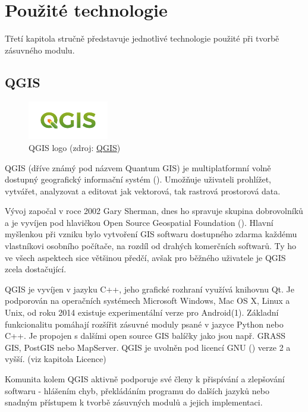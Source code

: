 \chapter{Použité technologie}
\label{3-technologie}

Třetí kapitola stručně představuje jednotlivé technologie použité při tvorbě zásuvného modulu.

\section{QGIS}

\begin{figure}[H]
    \centering
      \includegraphics[width=100pt]{./pictures/qgis-logo.png}
      \caption[QGIS logo]{QGIS logo 
      (zdroj: \href{https://www.qgis.org/en/_downloads/qgis-logo.png}{QGIS})}
      \label{fig:qgis}
  \end{figure}

QGIS (dříve známý pod názvem Quantum GIS) je multiplatformní volně dostupný geografický informační systém (). Umožňuje uživateli prohlížet, vytvářet, analyzovat a editovat jak vektorová, tak rastrová prostorová data.

Vývoj započal v roce 2002 Gary Sherman, dnes ho spravuje skupina dobrovolníků a je vyvíjen pod hlavičkou Open Source Geospatial Foundation (). Hlavní myšlenkou při vzniku bylo vytvoření GIS softwaru dostupného zdarma každému vlastníkovi osobního počítače, na rozdíl od drahých komerčních softwarů. Ty ho ve všech aspektech sice většinou předčí, avšak pro běžného uživatele je QGIS zcela dostačující.

QGIS je vyvíjen v jazyku C++, jeho grafické rozhraní využívá knihovnu Qt. Je podporován na operačních systémech Microsoft Windows, Mac OS X, Linux a Unix, od roku 2014 existuje experimentální verze pro Android(1). Základní funkcionalitu pomáhají rozšířit zásuvné moduly psané v jazyce Python nebo C++. Je propojen s dalšími open source GIS balíčky jako jsou např. GRASS GIS, PostGIS nebo MapServer. QGIS je uvolněn pod licencí GNU () verze 2 a vyšší. (viz kapitola Licence) 

Komunita kolem QGIS aktivně podporuje své členy k přispívání a zlepšování softwaru - hlášením chyb, překládáním programu do dalších jazyků nebo snadným přístupem k tvorbě zásuvných modulů a jejich implementaci. 

